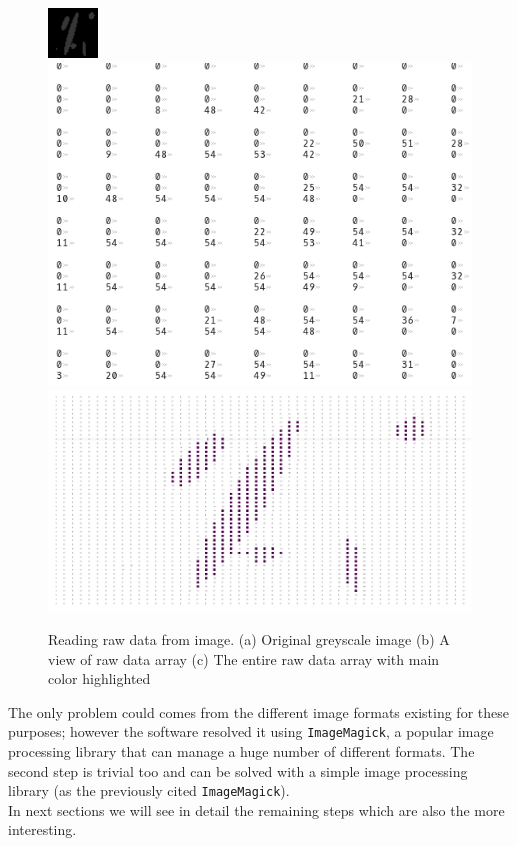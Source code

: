 \begin{figure}[htb] %
   \centering
   \includegraphics[width=0.27\linewidth]{images/grayscalesample.png}
   \includegraphics[width=0.47\linewidth]{images/imArraypart.png} \\
   
   \includegraphics[width=0.67\linewidth]{images/imArrayfull.png} \hfill
   \caption[Reading raw data from image]{Reading raw data from image. (a) Original greyscale image (b) A view of raw data array (c) The entire raw data array with main color highlighted}
   \label{fig:rawImage}
\end{figure}

The only problem could comes from the different image formats existing for these purposes; however the software resolved it using \texttt{ImageMagick}, a popular image processing library that can manage a huge number of different formats. The second step is trivial too and can be solved with a simple image processing library (as the previously cited \texttt{ImageMagick}).\\

In next sections we will see in detail the remaining steps which are also the more interesting.

